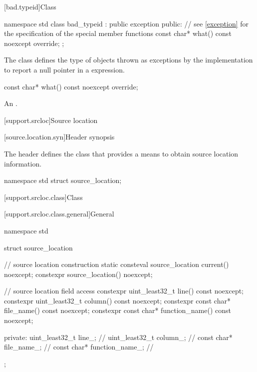 [bad.typeid]{Class }

%
%
\begin{codeblock}
namespace std {
  class bad_typeid : public exception {
  public:
    // see \ref{exception} for the specification of the special member functions
    const char* what() const noexcept override;
  };
}
\end{codeblock}

\pnum
The class
defines the type of objects
thrown as exceptions by the implementation to report a null pointer
in a
expression.

%
\begin{itemdecl}
const char* what() const noexcept override;
\end{itemdecl}

\begin{itemdescr}
\pnum
\returns
An  \ntbs{}.
\end{itemdescr}

[support.srcloc]{Source location}

[source.location.syn]{Header  synopsis}

\pnum
The header  defines
the class 
that provides a means to obtain source location information.

\begin{codeblock}
namespace std {
  struct source_location;
}
\end{codeblock}

[support.srcloc.class]{Class }

[support.srcloc.class.general]{General}

%
\begin{codeblock}
namespace std {
  struct source_location {
    // source location construction
    static consteval source_location current() noexcept;
    constexpr source_location() noexcept;

    // source location field access
    constexpr uint_least32_t line() const noexcept;
    constexpr uint_least32_t column() const noexcept;
    constexpr const char* file_name() const noexcept;
    constexpr const char* function_name() const noexcept;

  private:
    uint_least32_t line_;               // \expos
    uint_least32_t column_;             // \expos
    const char* file_name_;             // \expos
    const char* function_name_;         // \expos
  };
}
\end{codeblock}

